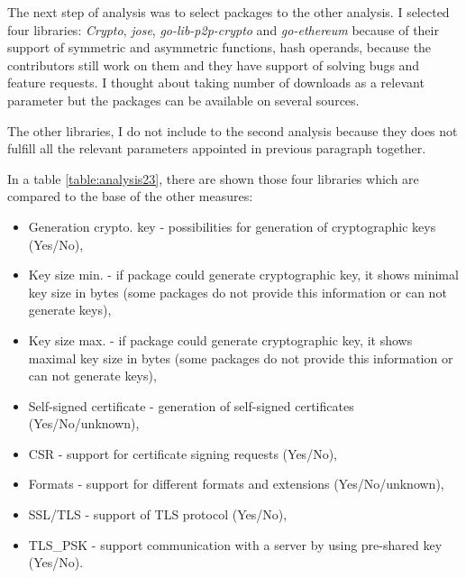 \documentclass[
  oneside, 12pt, 
  printed, %
  notable,   %
  nolof,     %
  nolot,     %
]{fithesis3}
\begin{document}
The next step of analysis was to select packages to the other analysis. I selected four libraries: 
\textit{Crypto}, \textit{jose}, \textit{go-lib-p2p-crypto} and \textit{go-ethereum} because of 
their support of symmetric and asymmetric functions, hash operands, because the contributors still 
work on them and they have support of solving bugs and feature requests. I thought about taking 
number of downloads as a relevant parameter but the packages can be available on several sources. 

The other libraries, I do not include to the second analysis because they does not fulfill all the 
relevant parameters appointed in previous paragraph together.

In a table \ref{table:analysis23}, there are shown those four libraries which are compared to the 
base of the other measures:
\begin{itemize}[leftmargin=2em,rightmargin=1em,itemsep=0.75\parskip,parsep=0em,topsep=0em,partopsep=0em]
\item Generation crypto. key - possibilities for generation of cryptographic keys (Yes/No),
\item Key size min. - if package could generate cryptographic key, it shows minimal key size in bytes (some packages do not provide this information or can not generate keys),
\item Key size max. - if package could generate cryptographic key, it shows maximal key size in bytes (some packages do not provide this information or can not generate keys),
\item Self-signed certificate - generation of self-signed certificates (Yes/No/unknown),
\item CSR - support for certificate signing requests (Yes/No),
\item Formats - support for different formats and extensions (Yes/No/unknown),
\item SSL/TLS - support of TLS protocol (Yes/No),
\item TLS\_PSK - support communication with a server by using pre-shared key (Yes/No).
\end{itemize}
\end{document}
